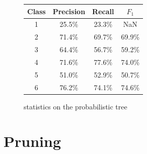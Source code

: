\documentclass{article}
\begin{document}
\begin{figure}[h]
{        \begin{tabular}{c | c c c}
        Class & Precision & Recall & $F_1$ \\
        \hline \hline
        1 & 25.5\% & 23.3\% & NaN \\ 
        2 & 71.4\% & 69.7\% & 69.9\% \\ 
        3 & 64.4\% & 56.7\% & 59.2\% \\ 
        4 & 71.6\% & 77.6\% & 74.0\% \\ 
        5 & 51.0\% & 52.9\% & 50.7\% \\ 
        6 & 76.2\% & 74.1\% & 74.6\% \\
        \end{tabular}
    }%
    \hspace*{\fill}
    
    \caption{statistics on the probabilistic tree}
\end{figure}


\section{Pruning}
\begin{figure}
\centering
{}
\end{figure}
\end{document}
